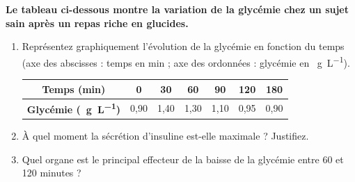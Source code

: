 \documentclass[11pt]{article}
\begin{document}
\begin{exercice}
\textbf{Le tableau ci-dessous montre la variation de la glycémie chez un sujet sain après un repas riche en glucides.}
\begin{enumerate}
    \item Représentez graphiquement l'évolution de la glycémie en fonction du temps (axe des abscisses : temps en min ; axe des ordonnées : glycémie en \SI{}{g.L^{-1}}).
    \begin{center}
    \begin{tabular}{|c|c|c|c|c|c|c|}
    \hline
    \textbf{Temps (min)} & 0 & 30 & 60 & 90 & 120 & 180 \\
    \hline
    \textbf{Glycémie (\SI{}{g.L^{-1}})} & 0,90 & 1,40 & 1,30 & 1,10 & 0,95 & 0,90 \\
    \hline
    \end{tabular}
    \end{center}
    \item À quel moment la sécrétion d'insuline est-elle maximale ? Justifiez.
    \item Quel organe est le principal effecteur de la baisse de la glycémie entre 60 et 120 minutes ?
\end{enumerate}
\end{exercice}
\end{document}
